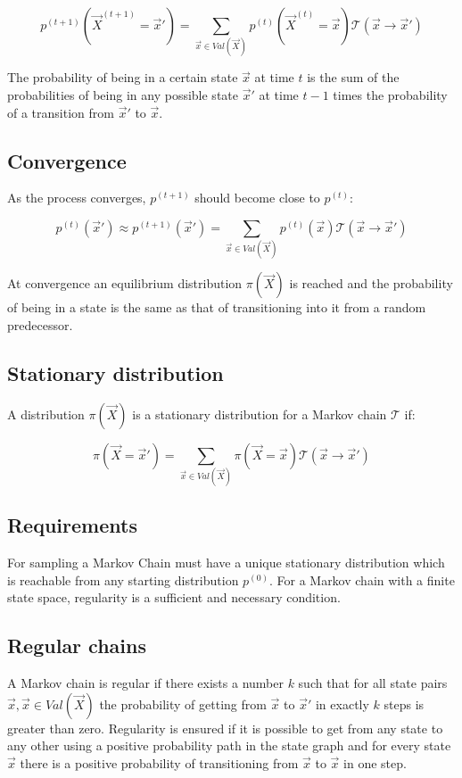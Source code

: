 	$$p^{(t+1)}(\vec{X}^{(t+1)} = \vec{x}') = \sum\limits_{\vec{x}\in Val(\vec{X})}p^{(t)}(\vec{X}^{(t)} = \vec{x})\mathcal{T}(\vec{x}\rightarrow\vec{x}')$$

	The probability of being in a certain state $\vec{x}$ at time $t$ is the sum of the probabilities of being in any possible state $\vec{x}'$ at time $t-1$ times the probability of a transition from $\vec{x}'$ to $\vec{x}$.

	\subsection{Convergence}
	As the process converges, $p^{(t+1)}$ should become close to $p^{(t)}$:

	$$p^{(t)}(\vec{x}')\approx p^{(t+1)}(\vec{x}') = \sum\limits_{\vec{x}\in Val(\vec{X})}p^{(t)}(\vec{x})\mathcal{T}(\vec{x}\rightarrow\vec{x}')$$

	At convergence an equilibrium distribution $\pi(\vec{X})$ is reached and the probability of being in a state is the same as that of transitioning into it from a random predecessor.

	\subsection{Stationary distribution}
	A distribution $\pi(\vec{X})$ is a stationary distribution for a Markov chain $\mathcal{T}$ if:

	$$\pi(\vec{X}=\vec{x}') = \sum\limits_{\vec{x}\in Val(\vec{X})}\pi(\vec{X} = \vec{x})\mathcal{T}(\vec{x}\rightarrow\vec{x}')$$

	\subsection{Requirements}
	For sampling a Markov Chain must have a unique stationary distribution which is reachable from any starting distribution $p^{(0)}$.
	For a Markov chain with a finite state space, regularity is a sufficient and necessary condition.

	\subsection{Regular chains}
	A Markov chain is regular if there exists a number $k$ such that for all state pairs $\vec{x},\vec{x}\in Val(\vec{X})$ the probability of getting from $\vec{x}$ to $\vec{x}'$ in exactly $k$ steps is greater than zero.
	Regularity is ensured if it is possible to get from any state to any other using a positive probability path in the state graph and for every state $\vec{x}$ there is a positive probability of transitioning from $\vec{x}$ to $\vec{x}$ in one step.

